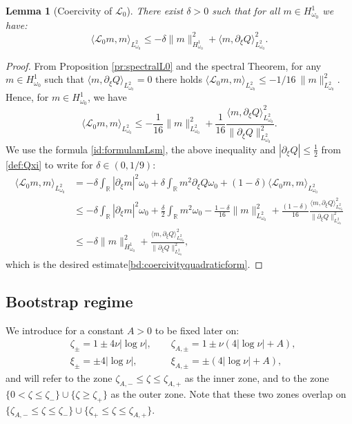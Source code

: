 \documentclass[11pt]{aims}
\newtheorem{lemma}[theorem]{Lemma}
\theoremstyle{definition}
\newcommand{\Ls}{\mathscr{L}}
\newcommand{\pa}{\partial}
\numberwithin{equation}{section}
\begin{document}
\begin{lemma}[Coercivity of $\Ls_0$] \label{lemm:coerLs0} There exist $\delta > 0$ such that for all $m \in H^1_{\omega_0}$ we have:
\begin{equation} \label{bd:coercivityquadraticform}
\langle \Ls_0 m, m\rangle_{L^2_{\omega_0}} \leq -\delta \| m\|_{H^1_{\omega_0}}^2+\langle m, \pa_\xi Q\rangle_{L^2_{\omega_0}}^2. 
\end{equation}
\end{lemma}
\begin{proof}
From Proposition \ref{pr:spectralL0} and the spectral Theorem, for any $m\in H^1_{\omega_0}$ such that $\langle m ,\pa_\xi Q \rangle_{L^2_{\omega_0}}=0$ there holds $\langle \Ls_0 m, m\rangle_{L^2_{\omega_0}} \leq - 1 / 16 \ \| m \|_{L^2_{\omega_0}}^2$. Hence, for $m\in H^1_{\omega_0}$, we have
$$
\langle \Ls_0 m, m\rangle_{L^2_{\omega_0}} \leq - \frac{1}{16}\| m \|_{L^2_{\omega_0}}^2+\frac{1}{16} \frac{\langle m , \pa_\xi Q \rangle_{L^2_{\omega_0}}^2}{\| \pa_\xi Q \|_{L^2_{\omega_0}}^2}.
$$
We use the formula \eqref{id:formulamLsm}, the above inequality and $|\pa_\xi Q|\leq \frac12$ from \eqref{def:Qxi} to write for $\delta \in (0, 1/9)$:
\begin{align*}
\langle \Ls_0 m, m\rangle_{L^2_{\omega_0}} & = -\delta \int_{\mathbb R} |\pa_\xi m|^2 \omega_0 +\delta\int_{\mathbb R}m^2 \pa_\xi Q \omega_0 +(1 - \delta)\langle \Ls_0 m, m\rangle_{L^2_{\omega_0}} \\
&\leq -\delta\int_{\mathbb R} |\pa_\xi m|^2 \omega_0 +\frac{\delta}{2}\int_{\mathbb R}m^2 \omega_0 - \frac{1-\delta}{16}\| m \|_{L^2_{\omega_0}}^2+\frac{(1 - \delta)}{16} \frac{\langle m , \pa_\xi Q \rangle_{L^2_{\omega_0}}^2}{\| \pa_\xi Q \|_{L^2_{\omega_0}}^2}\\
&\leq -\delta \| m\|_{H^1_{\omega_0}}^2+ \frac{\langle m , \pa_\xi Q \rangle_{L^2_{\omega_0}}^2}{\| \pa_\xi Q \|_{L^2_{\omega_0}}^2},
\end{align*}
which is the desired estimate\eqref{bd:coercivityquadraticform}.
\end{proof}

\subsection{Bootstrap regime} \label{sec:bootstrap}

We introduce for a constant $A > 0$ to be fixed later on:
\begin{align} \label{def:zetapm}
& \zeta_{\pm}=1\pm 4\nu |\log \nu|, \qquad  \zeta_{A,\pm}=1\pm \nu (4|\log \nu|+A),\\
 \label{def:xipm}
&\xi_{\pm}=\pm 4 |\log \nu|, \ \ \quad \qquad  \xi_{A,\pm}=\pm (4|\log \nu|+A),
\end{align}
and will refer to the zone $\zeta_{A,-} \leq \zeta \leq \zeta_{A,+}$ as the inner zone, and to the zone $\{ 0<\zeta\leq \zeta_-\} \cup \{ \zeta\geq \zeta_+\}$ as the outer zone. Note that these two zones overlap on $\{\zeta_{A,-}\leq \zeta \leq \zeta_-\}\cup \{ \zeta_+\leq \zeta \leq \zeta_{A,+}\}$.
\end{document}
